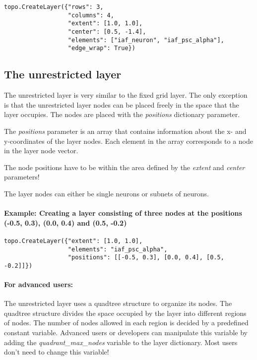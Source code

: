 \documentclass{article}
\begin{document}
\begin{verbatim}
topo.CreateLayer({"rows": 3,
                  "columns": 4,
                  "extent": [1.0, 1.0],
                  "center": [0.5, -1.4],
                  "elements": ["iaf_neuron", "iaf_psc_alpha"],
                  "edge_wrap": True})
\end{verbatim}

\subsection{The unrestricted layer}

The unrestricted layer is very similar to the fixed grid layer. The only exception is that the unrestricted layer nodes can be placed freely in the space that the layer occupies. The nodes are placed with the \emph{positions} dictionary parameter.

The \emph{positions} parameter is an array that contains information about the x- and y-coordinates of the layer nodes. Each element in the array corresponds to a node in the layer node vector.

The node positions have to be within the area defined by the \emph{extent} and \emph{center} parameters!

The layer nodes can either be single neurons or subnets of neurons.

\paragraph{Example: Creating a layer consisting of three nodes at the positions (-0.5, 0.3), (0.0, 0.4) and (0.5, -0.2)}

\begin{verbatim}
topo.CreateLayer({"extent": [1.0, 1.0],
                  "elements": "iaf_psc_alpha",
                  "positions": [[-0.5, 0.3], [0.0, 0.4], [0.5, -0.2]]})
\end{verbatim}

\paragraph{For advanced users:}

The unrestricted layer uses a quadtree structure to organize its nodes. The quadtree structure divides the space occupied by the layer into different regions of nodes. The number of nodes allowed in each region is decided by a predefined constant variable. Advanced users or developers can manipulate this variable by adding the \emph{quadrant\_max\_nodes} variable to the layer dictionary. Most users don't need to change this variable!
\end{document}
